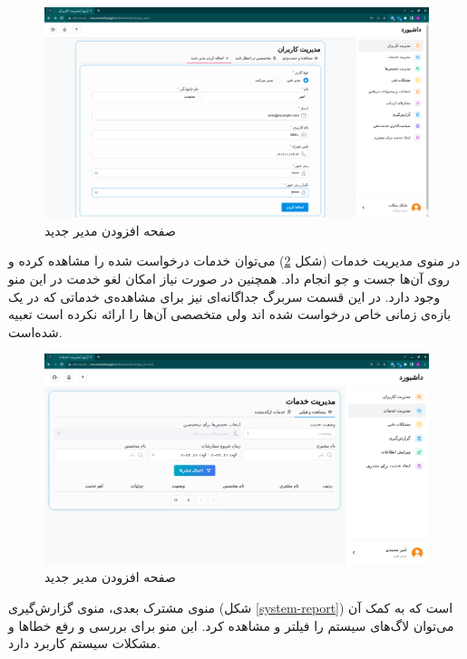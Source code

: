 \begin{figure}[h]
	\centering
	\includegraphics[width=\textwidth]{figs/user-guide/cm-add-manager}
	\caption{صفحه افزودن مدیر جدید}
	\label{add-manager}
\end{figure}

\FloatBarrier

در منوی مدیریت خدمات (شکل \ref{manage-requests}) می‌توان خدمات درخواست شده را مشاهده کرده و روی آن‌ها جست و جو انجام داد.
همچنین در صورت نیاز امکان لغو خدمت در این منو وجود دارد.
در این قسمت سربرگ جداگانه‌ای نیز برای مشاهده‌ی خدماتی که در یک بازه‌ی زمانی خاص درخواست شده اند ولی متخصصی آن‌ها را ارائه نکرده است تعبیه شده‌است.

\begin{figure}[h]
	\centering
	\includegraphics[width=\textwidth]{figs/user-guide/tm-manage-requests}
	\caption{صفحه افزودن مدیر جدید}
	\label{manage-requests}
\end{figure}

\FloatBarrier

منوی مشترک بعدی، منوی گزارش‌گیری (شکل \ref{system-report}) است که به کمک آن می‌توان لاگ‌های سیستم را فیلتر و مشاهده کرد.
این منو برای بررسی و رفع خطاها و مشکلات سیستم کاربرد دارد.

